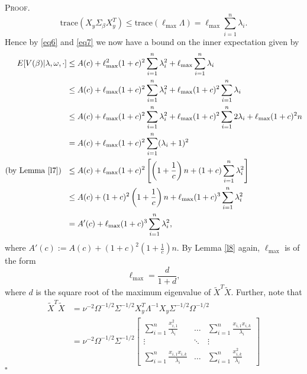 \documentclass[12pt]{article}
\newcounter{ProofCounter}
\newenvironment{Proof}{\stepcounter{ProofCounter}\textsc{Proof.}}{\hfill$\square$}
\begin{document}
\begin{Proof}
  \begin{equation}
    \text{trace}(X_y \Sigma_\beta X_{y}^T) \leq \text{trace}(\ell_{\max} \Lambda) = \ell_{\max} \sum_{i=1}^{n} \lambda_i.
    \label{eq7}
  \end{equation}
  Hence by \eqref{eq6} and \eqref{eq7} we now have a bound on the inner expectation given by 
  \begin{align}
    E[V(\beta) | \lambda, \omega, \cdot] & \leq A(c) + \ell_{\max}^2(1 + c)^2 \sum_{i=1}^{n} \lambda_i^2 + \ell_{\max} \sum_{i=1}^{n} \lambda_i
    \nonumber \\
    & \leq A(c) + \ell_{\max}(1 + c)^2 \sum_{i=1}^{n}\lambda_i^2 + \ell_{\max}(1 + c)^2 \sum_{i=1}^{n}\lambda_i \nonumber \\
    & \leq A(c) + \ell_{\max}(1 + c)^2 \sum_{i=1}^{n}\lambda_i^2 + \ell_{\max}(1 + c)^2 \sum_{i=1}^{n}2\lambda_i  + \ell_{\max}(1 + c)^2 n \nonumber \\
    & = A(c) + \ell_{\max}(1 + c)^2 \sum_{i=1}^{n}(\lambda_i + 1)^2 \nonumber \\
    \text{(by Lemma \ref{l7}) } \ & \leq A(c) + \ell_{\max}(1 + c)^2 \left[ \left( 1 + \frac{1}{c} \right)n + (1 + c)\sum_{i=1}^{n}\lambda_i^2 \right] \nonumber \\
    & \leq A(c) + (1 + c)^2\left( 1 + \frac{1}{c} \right)n + \ell_{\max}(1 + c)^3 \sum_{i=1}^{n} \lambda_i^2 \nonumber \\
    & = A'(c) + \ell_{\max}(1 + c)^3 \sum_{i=1}^{n} \lambda_i^2,
    \label{eq9}
  \end{align}
  where $A'(c) := A(c) + (1 + c)^2\left( 1 + \frac{1}{c} \right)n$. By Lemma \ref{l8} again, $\ell_{\max}$ is of the form 
  \begin{equation}
    \ell_{\max} = \frac{d}{1 + d}, 
    \label{eq10}
  \end{equation}
  where $d$ is the square root of the maximum eigenvalue of $\tilde{X}^T
  \tilde{X}$. Further, note that 
  \begin{align*}
    \tilde{X}^T \tilde{X} & = \nu^{-2} \Omega^{-1/2}\Sigma^{-1/2} X_y^T \Lambda^{-1} X_y \Sigma^{-1/2}\Omega^{-1/2} \\
    & = \nu^{-2} \Omega^{-1/2}\Sigma^{-1/2} \begin{bmatrix}
      \sum_{i=1}^{n}\frac{x_{i,1}^2}{\lambda_i} & \dots & \sum_{i=1}^{n}\frac{ x_{i,1}x_{i,k}}{\lambda_i} \\
      \vdots & \ddots & \vdots \\
      \sum_{i=1}^{n} \frac{x_{i,1}x_{i,k}}{\lambda_i} & \dots & \sum_{i=1}^{n}\frac{ x_{i,k}^2}{\lambda_i}

\end{bmatrix}
\end{align*}
\end{Proof}
\end{document}
